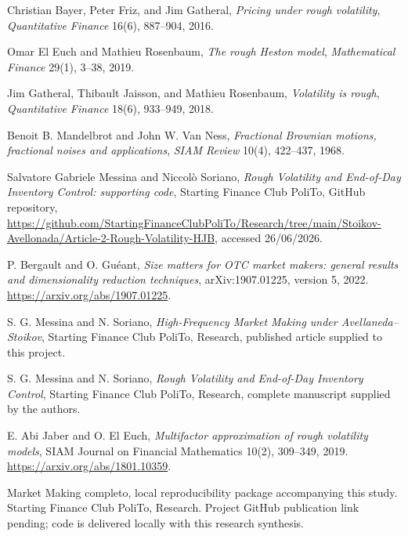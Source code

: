 \begin{references}
 Christian Bayer, Peter Friz, and Jim Gatheral,
\emph{Pricing under rough volatility},
\emph{Quantitative Finance} 16(6), 887--904, 2016.

 Omar El Euch and Mathieu Rosenbaum,
\emph{The rough Heston model},
\emph{Mathematical Finance} 29(1), 3--38, 2019.

 Jim Gatheral, Thibault Jaisson, and Mathieu Rosenbaum,
\emph{Volatility is rough},
\emph{Quantitative Finance} 18(6), 933--949, 2018.

 Benoit B. Mandelbrot and John W. Van Ness,
\emph{Fractional Brownian motions, fractional noises and applications},
\emph{SIAM Review} 10(4), 422--437, 1968.

 Salvatore Gabriele Messina and Niccol\`o Soriano,
\emph{Rough Volatility and End-of-Day Inventory Control: supporting code},
Starting Finance Club PoliTo, GitHub repository,
\url{https://github.com/StartingFinanceClubPoliTo/Research/tree/main/Stoikov-Avellonada/Article-2-Rough-Volatility-HJB},
accessed 26/06/2026.

 P. Bergault and O. Gu\'eant, \textit{Size matters for OTC market makers: general results and dimensionality reduction techniques}, arXiv:1907.01225, version 5, 2022. \url{https://arxiv.org/abs/1907.01225}.

 S. G. Messina and N. Soriano, \textit{High-Frequency Market Making under Avellaneda--Stoikov}, Starting Finance Club PoliTo, Research, published article supplied to this project.

 S. G. Messina and N. Soriano, \textit{Rough Volatility and End-of-Day Inventory Control}, Starting Finance Club PoliTo, Research, complete manuscript supplied by the authors.

 E. Abi Jaber and O. El Euch, \emph{Multifactor approximation of rough volatility models}, SIAM Journal on Financial Mathematics 10(2), 309--349, 2019. \url{https://arxiv.org/abs/1801.10359}.

 Market Making completo, local reproducibility package accompanying this study. Starting Finance Club PoliTo, Research. Project GitHub publication link pending; code is delivered locally with this research synthesis.

\end{references}
